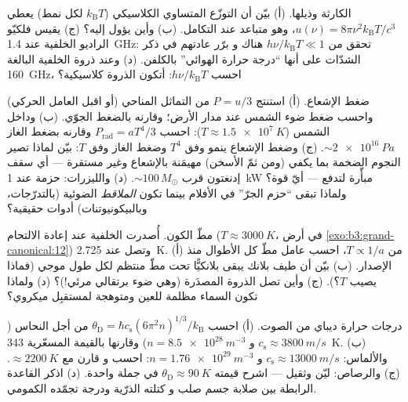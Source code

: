 \begin{exercise}[$\star$]\label{exo:b3:photons-phonons:4}
الكارثة وذيلها. (أ) بيّن أن التوزّع المتساوي الكلاسيكي
($k_{\text{B}}T$ لكل نمط) يعطي $u(\nu) =
8\pi\nu^2k_{\text{B}}T/c^3$، وهو متباعد عند التكامل. (ب) وأين
يؤول  إليه؟ (ج) يقيس فلكيّو الراديو
الخلفية عند \qty{1.4}{GHz}: تحقق من $h\nu/k_{\text{B}}T \ll 1$ هناك و
برّر عادتهم في ذكر الشدّات على أنها ``درجة حرارة الهوائي''
بالكلفن. (د) وعند ذروة الخلفية البالغة \qty{160}{GHz}، احسب
$h\nu/k_{\text{B}}T$: أتكون الذروة كلاسيكية؟
\end{exercise}

\begin{exercise}[$\star\star$]\label{exo:b3:photons-phonons:5}
ضغط الإشعاع. (أ) استنتج $P = u/3$ من التماثل المناحي (أو اقبل
العامل الحركي) واحسب ضغط ضوء الشمس عند
مدار الأرض؛ وقارنه بالضغط الجوّي. (ب) وداخل
الشمس ($T \approx \qty{1.5e7}{K}$): احسب $P_{\text{rad}} =
aT^4/3$ وقارنه بضغط الغاز $\sim\qty{2e16}{Pa}$.
(ج) وضغط الإشعاع ينمو وفق $T^4$ وضغط الغاز وفق $T$: بيّن
لماذا تصير النجوم الضخمة بما يكفي (ومن ثمّ الأسخن)
مهيمَنة بالإشعاع وغير مستقرة --- أي سقف إدنغتون قرب
$\sim100\,M_\odot$. (د) والليزرات: حزمة عند \qty{1}{kW} مبأّرة
لتدفع --- أيّ قوة؟ ولماذا تبقى ``حزم الجرّ'' في الأفلام بينما
تكون \emph{الملاقط} الضوئية (بالتدرّجات، وبالبيكونيوتنات) أدوات حقيقية؟
\end{exercise}

\begin{exercise}[$\star\star$]\label{exo:b3:photons-phonons:6}
مطّ الكون. أُصدرت الخلفية عند إعادة الالتحام
($T \approx \qty{3000}{K}$، في أرض
\cref{exo:b3:grand-canonical:12}) وتصل عند \qty{2.725}{K}. (أ) من $T \propto
1/a$، احسب عامل مطّ كل الأطوال منذ الإصدار. (ب) بيّن
أن طيف بلانك يبقى بلانكيًّا تحت مطّ منتظم لكل
طول موجي (فماذا يصيب $T$؟). (ج) وأين تصل الذروة
المصدَرة (وهي ضوء برتقالي مرئي!)؟ (د) ولماذا تكون السماء مظلمة
للعين ومتوهجة لمستقبِل ميكروي؟
\end{exercise}

\begin{exercise}[$\star\star$]\label{exo:b3:photons-phonons:7}
درجات حرارة ديباي من الصوت. (أ) احسب $\theta_{\text{D}} =
\hbar c_{\text{s}}(6\pi^2n)^{1/3}/k_{\text{B}}$ من أجل النحاس
($c_{\text{s}} \approx \qty{3800}{m/s}$ و $n =
\qty{8.5e28}{m^{-3}}$) وقارنها بالقيمة المسعّرية
\qty{343}{K}. (ب) والألماس: $c_{\text{s}} \approx
\qty{13000}{m/s}$ و $n = \qty{1.76e29}{m^{-3}}$: احسب و
قارن مع $\approx\qty{2200}{K}$. (ج) والرصاص: ليّن وثقيل ---
اشرح قيمته $\theta_{\text{D}} \approx \qty{90}{K}$ في جملة
واحدة. (د) اذكر القاعدة الرابطة بين صلابة جسم صلب و
كتلته الذرّية ودرجة تجمّده الكمومي.
\end{exercise}

